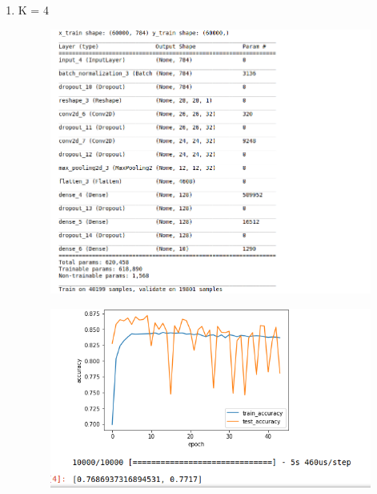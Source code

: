 \documentclass{article}
\begin{document}
\begin{enumerate}
        \clearpage
    \item  K = 4
        \begin{figure}[!ht]
            \begin{center}
                \includegraphics[width=1.0\textwidth]{c2a.png}
            \end{center}
        \end{figure}
        \begin{figure}[!ht]
            \begin{center}
                \includegraphics[width=1.0\textwidth]{c4b.png}
            \end{center}
        \end{figure}
        \clearpage
\end{enumerate}
\end{document}
